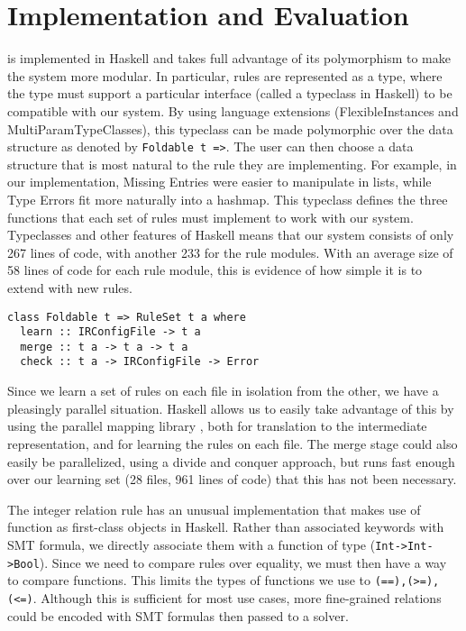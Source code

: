 \section{Implementation and Evaluation}

\app is implemented in Haskell and takes full advantage of its polymorphism to make the system more modular.
In particular, rules are represented as a type, where the type must support a particular interface (called a typeclass in Haskell) to be compatible with our system.
By using language extensions (FlexibleInstances and MultiParamTypeClasses), this typeclass can be made polymorphic over the data structure as denoted by \lstinline{Foldable t =>}.
The user can then choose a data structure that is most natural to the rule they are implementing.
For example, in our implementation, Missing Entries were easier to manipulate in lists, while Type Errors fit more naturally into a hashmap.
This typeclass defines the three functions that each set of rules must implement to work with our system.
Typeclasses and other features of Haskell means that our system consists of only 267 lines of code, with another 233 for the rule modules.
With an average size of 58 lines of code for each rule module, this is evidence of how simple it is to extend \app with new rules.

\begin{lstlisting}
class Foldable t => RuleSet t a where
  learn :: IRConfigFile -> t a
  merge :: t a -> t a -> t a
  check :: t a -> IRConfigFile -> Error
\end{lstlisting}

Since we learn a set of rules on each file in isolation from the other, we have a pleasingly parallel situation.
Haskell allows us to easily take advantage of this by using the parallel mapping library \cite{}, both for translation to the intermediate representation, and for learning the rules on each file.
The merge stage could also easily be parallelized, using a divide and conquer approach, but \app runs fast enough over our learning set (28 files, 961 lines of code) that this has not been necessary.

The integer relation rule has an unusual implementation that makes use of function as first-class objects in Haskell.
Rather than associated keywords with SMT formula, we directly associate them with a function of type (\lstinline{Int->Int->Bool}).
Since we need to compare rules over equality, we must then have a way to compare functions.
This limits the types of functions we use to \lstinline{(==),(>=),(<=)}.
Although this is sufficient for most use cases, more fine-grained relations could be encoded with SMT formulas then passed to a solver.


